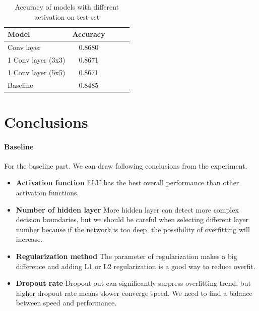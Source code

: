 \documentclass{article}
\begin{document}
\begin{table}[tb]
\vskip 3mm
\begin{center}
\begin{small}
\begin{sc}
\begin{tabular}{lcccr}
\hline
\abovespace\belowspace
Model & Accuracy \\
\hline
\abovespace
2 Conv layer    	& 0.8680 	\\
1 Conv layer (3x3)	 	& 0.8671 	\\
1 Conv layer (5x5)	 	& 0.8671 	\\

Baseline				  	& 0.8485 	\\

\hline
\end{tabular}
\end{sc}
\end{small}
\caption{Accuracy of models with different activation on test set}
\label{tab:cnn}
\end{center}
\vskip -3mm
\end{table}





\section{Conclusions}
\label{sec:concl}
\paragraph{Baseline} For the baseline part. We can draw following conclusions from the experiment. 
\begin{itemize}
	\item \textbf{Activation function} ELU has the best overall performance than other activation functions.
	\item \textbf{Number of hidden layer} More hidden layer can detect more complex decision boundaries, but we should be careful when selecting different layer number because if the network is too deep, the possibility of overfitting will increase.
	\item \textbf{Regularization method} The parameter of regularization makes a big difference and adding L1 or L2 regularization is a good way to reduce overfit.
	\item \textbf{Dropout rate} Dropout out can significantly surpress overfitting trend, but higher dropout rate means slower converge speed. We need to find  a balance between speed and performance.

\end{itemize}
\end{document}
